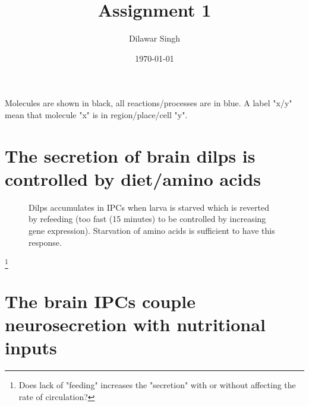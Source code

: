 \documentclass[]{article}
\title{Assignment 1}
\author{Dilawar Singh}
\date{\today}
\begin{document}
\maketitle

Molecules are shown in black, all reactions/processes are in blue. A label "x/y"
mean that molecule "x" is in region/place/cell "y".

\section{The secretion of brain dilps is controlled by diet/amino acids}
\label{the-secretion-of-brain-dilps-is-controlled-by-diet}

\begin{figure}[ht!]
    \centering
{}    
\caption{
    Dilps accumulates in IPCs when larva is starved which is reverted
        by refeeding (too fast (15 minutes) to be controlled by increasing gene
        expression). Starvation of amino acids is sufficient to have this response.
    } 
\end{figure}

\footnote{Does lack of "feeding" increases the "secretion" with or without
    affecting the rate of circulation?}

\section{The brain IPCs couple neurosecretion with nutritional inputs}
\end{document}
